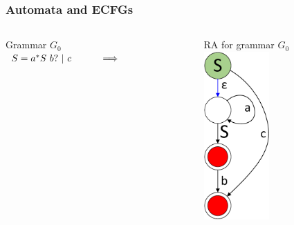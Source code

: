 \documentclass{beamer}
\begin{document}
	\begin{frame} 
		\frametitle{Automata and ECFGs}
		
		\begin{columns}
			\begin{column}{4cm}
				Grammar $G_0$\\
				\vspace{10pt}
				$
				\begin{array}[b]{rl}
				S = a^{*} S\ b? \ | \ c \ \ \ \ \ \ \ \ \  \Longrightarrow
				\end{array}
				$
			\end{column}
			\begin{column}{3cm}
				RA for grammar $G_0$\\
				\vspace{10pt}
				\includegraphics[width=2.5cm]{pictures/G0initialAutomaton.pdf}
			\end{column}
		\end{columns}

	\end{frame}
\end{document}

